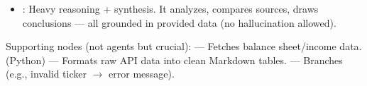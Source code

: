 \documentclass[letterpaper,10pt,english]{sphinxmanual}
\begin{document}
\begin{enumerate}
\begin{itemize}
\begin{itemize}
\item {} 
\sphinxAtStartPar
Input: Formatted financial table + extracted research texts.

\end{itemize}

\item {} 
\sphinxAtStartPar
{}: Heavy reasoning + synthesis. It analyzes,
compares sources, draws conclusions — all grounded in provided
data (no hallucination allowed).

\end{itemize}

\end{enumerate}

\sphinxAtStartPar
Supporting nodes (not agents but crucial): \sphinxhyphen{}  —
Fetches balance sheet/income data. \sphinxhyphen{}  (Python) — Formats
raw API data into clean Markdown tables. \sphinxhyphen{}  —
Branches (e.g., invalid ticker \(\rightarrow\) error message).
\end{document}
